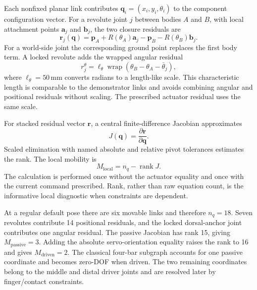 \documentclass[11pt]{article}
\begin{document}
Each nonfixed planar link contributes
$\mathbf{q}_i=(x_i,y_i,\theta_i)$ to the component configuration vector. For a
revolute joint $j$ between bodies $A$ and $B$, with local attachment points
$\mathbf{a}_j$ and $\mathbf{b}_j$, the two closure residuals are
\begin{equation}
  \mathbf{r}_j(\mathbf{q})=
  \mathbf{p}_A+R(\theta_A)\mathbf{a}_j
  -\mathbf{p}_B-R(\theta_B)\mathbf{b}_j.
  \label{eq:revolute}
\end{equation}
For a world-side joint the corresponding ground point replaces the first body
term. A locked revolute adds the wrapped angular residual
\begin{equation}
  r^{\theta}_j=\ell_{\theta}
  \operatorname{wrap}(\theta_B-\theta_A-\bar\theta_j),
\end{equation}
where $\ell_{\theta}=50\,\mathrm{mm}$ converts radians to a length-like scale.
This characteristic length is comparable to the demonstrator links and avoids
combining angular and positional residuals without scaling. The prescribed
actuator residual uses the same scale.

For stacked residual vector $\mathbf{r}$, a central finite-difference Jacobian
approximates
\begin{equation}
  J(\mathbf{q})=\frac{\partial\mathbf{r}}{\partial\mathbf{q}}.
\end{equation}
Scaled elimination with named absolute and relative pivot tolerances estimates
the rank. The local mobility is
\begin{equation}
  M_{\mathrm{local}}=n_q-\operatorname{rank}J.
  \label{eq:mobility}
\end{equation}
The calculation is performed once without the actuator equality and once with
the current command prescribed. Rank, rather than raw equation count, is the
informative local diagnostic when constraints are dependent.

At a regular default pose there are six movable links and therefore
$n_q=18$. Seven revolutes contribute 14 positional residuals, and the locked
dorsal-anchor joint contributes one angular residual. The passive Jacobian has
rank 15, giving $M_{\mathrm{passive}}=3$. Adding the absolute servo-orientation
equality raises the rank to 16 and gives $M_{\mathrm{driven}}=2$. The classical
four-bar subgraph accounts for one passive coordinate and becomes zero-DOF
when driven. The two remaining coordinates belong to the middle and distal
driver joints and are resolved later by finger/contact constraints.
\end{document}
